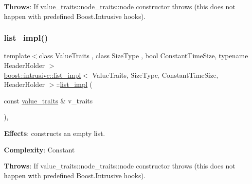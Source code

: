 {\bfseries Throws}\+: If value\+\_\+traits\+::node\+\_\+traits\+::node constructor throws (this does not happen with predefined Boost.\+Intrusive hooks). \mbox{\label{classboost_1_1intrusive_1_1list__impl_aec7438abf9f510b1bea085bf3ab562e9}} 
\subsubsection{\texorpdfstring{list\+\_\+impl()}{list\_impl()}\hspace{0.1cm}{\footnotesize\ttfamily [2/4]}}
{\footnotesize\ttfamily template$<$class Value\+Traits , class Size\+Type , bool Constant\+Time\+Size, typename Header\+Holder $>$ \\
\hyperlink{classboost_1_1intrusive_1_1list__impl}{boost\+::intrusive\+::list\+\_\+impl}$<$ Value\+Traits, Size\+Type, Constant\+Time\+Size, Header\+Holder $>$\+::\hyperlink{classboost_1_1intrusive_1_1list__impl}{list\+\_\+impl} (\begin{DoxyParamCaption}\item[{const \hyperlink{classboost_1_1intrusive_1_1list__impl_a5cd55672f6df367749d91ef708834126}{value\+\_\+traits} \&}]{v\+\_\+traits }\end{DoxyParamCaption})\hspace{0.3cm}{\ttfamily [inline]}, {\ttfamily [explicit]}}

{\bfseries Effects}\+: constructs an empty list.

{\bfseries Complexity}\+: Constant

{\bfseries Throws}\+: If value\+\_\+traits\+::node\+\_\+traits\+::node constructor throws (this does not happen with predefined Boost.\+Intrusive hooks). \mbox{\label{classboost_1_1intrusive_1_1list__impl_a7d841d7401e3bdac5353785ceb4e8faf}} 
